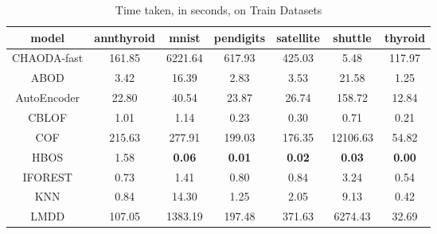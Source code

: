 \begin{table*}[!t]
\renewcommand{\arraystretch}{1.25}
\caption{Time taken, in seconds, on Train Datasets}
\label{table:results:train-time}
\centering
\begin{tabular}{|c|c|c|c|c|c|c|}
\hline
\textbf{\textbf{model}} & \textbf{\textbf{annthyroid}} & \textbf{\textbf{mnist}} & \textbf{\textbf{pendigits}} & \textbf{\textbf{satellite}} & \textbf{\textbf{shuttle}} & \textbf{\textbf{thyroid}} \\
\hline
                CHAODA-fast &                       161.85 &                 6221.64 &                      617.93 &                      425.03 &                      5.48 &                    117.97 \\
\hline
                        ABOD &                         3.42 &                   16.39 &                        2.83 &                        3.53 &                     21.58 &                      1.25 \\
\hline
                AutoEncoder &                        22.80 &                   40.54 &                       23.87 &                       26.74 &                    158.72 &                     12.84 \\
\hline
                        CBLOF &                         1.01 &                    1.14 &                        0.23 &                        0.30 &                      0.71 &                      0.21 \\
\hline
                        COF &                       215.63 &                  277.91 &                      199.03 &                      176.35 &                  12106.63 &                     54.82 \\
\hline
                        HBOS &                         1.58 &           \textbf{0.06} &               \textbf{0.01} &               \textbf{0.02} &             \textbf{0.03} &             \textbf{0.00} \\
\hline
                IFOREST &                         0.73 &                    1.41 &                        0.80 &                        0.84 &                      3.24 &                      0.54 \\
\hline
                        KNN &                         0.84 &                   14.30 &                        1.25 &                        2.05 &                      9.13 &                      0.42 \\
\hline
                        LMDD &                       107.05 &                 1383.19 &                      197.48 &                      371.63 &                   6274.43 &                     32.69 \\

\end{tabular}
\end{table*}
